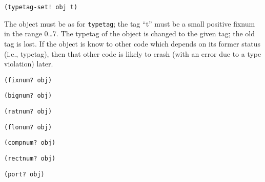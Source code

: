 \begin{description}
\item {\verb+(typetag-set! obj t)+}

The object must be as for {\tt typetag}; the tag ``t'' must be a small
positive fixnum in the range 0\ldots 7. The typetag of the object is changed
to the given tag; the old tag is lost. If the object is know to other
code which depends on its former status (i.e., typetag), then that other
code is likely to crash (with an error due to a type violation) later.

\item {\verb+(fixnum? obj)+}

\item {\verb+(bignum? obj)+}

\item {\verb+(ratnum? obj)+}

\item {\verb+(flonum? obj)+}

\item {\verb+(compnum? obj)+}

\item {\verb+(rectnum? obj)+}

\item {\verb+(port? obj)+}

\end{description}


